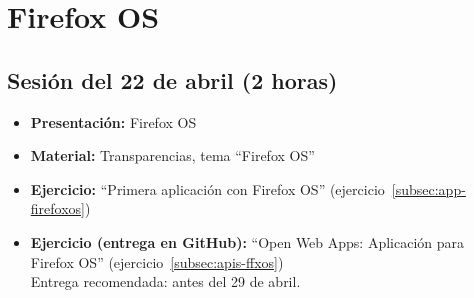 \documentclass[a4paper,12pt]{report}
\begin{document}
\section{Firefox OS}

\subsection{Sesión del 22 de abril (2 horas)}

\begin{itemize}
 \item \textbf{Presentación:} Firefox OS
 \item \textbf{Material:} Transparencias, tema ``Firefox OS''
 \item \textbf{Ejercicio:} ``Primera aplicación con Firefox OS'' (ejercicio~\ref{subsec:app-firefoxos})
 \item \textbf{Ejercicio (entrega en GitHub):} ``Open Web Apps: Aplicación para Firefox OS'' (ejercicio~\ref{subsec:apis-ffxos}) 
 \\
Entrega recomendada: antes del 29 de abril.
\end{itemize}




\end{document}
